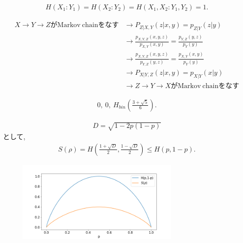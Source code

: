 \begin{ex}
    \label{ex11.9}
    \begin{align*}
        H(X_1 : Y_1) = H(X_2 : Y_2) =  H(X_1, X_2 : Y_1, Y_2) = 1.
    \end{align*}
\end{ex}

\begin{ex}
    \label{ex11.10}
    \begin{align*}
        X \to Y \to Z \mathrm{がMarkov\ chainをなす}
         & \longrightarrow
        P_{Z|X,Y}(z|x,y) = p_{Z|Y}(z|y)                                       \\
         & \longrightarrow
        \frac{p_{X,Y,Z}(x,y,z)}{p_{X,Y}(x,y)} = \frac{p_{Y,Z}(y,z)}{p_{Y}(y)} \\
         & \longrightarrow
        \frac{p_{X,Y,Z}(x,y,z)}{p_{Y,Z}(y,z)} = \frac{p_{X,Y}(x,y)}{p_{Y}(y)} \\
         & \longrightarrow
        P_{X|Y,Z}(z|x,y) = p_{X|Y}(x|y)                                       \\
         & \longrightarrow
        Z \to Y \to X \mathrm{がMarkov\ chainをなす}
    \end{align*}
\end{ex}

\begin{ex}
    \label{ex11.11}
    \begin{align*}
        0,\ 0, \ H_{bin}\left( \frac{3 + \sqrt{5}}{6}\right).
    \end{align*}
\end{ex}

\begin{ex}
    \label{ex11.12}
    \begin{align*}
        D = \sqrt{1-2p(1-p)}
    \end{align*}
    として,
    \begin{align*}
        S\left( \rho\right) = H\left( \frac{1 + \sqrt{D}}{2}, \frac{1 - \sqrt{D}}{2}\right) \leq H(p,1-p).
    \end{align*}
    \begin{figure}[H]
        \begin{center}
            \includegraphics[width = 80mm]{../fig/ex11_12.png}
        \end{center}
    \end{figure}
\end{ex}

